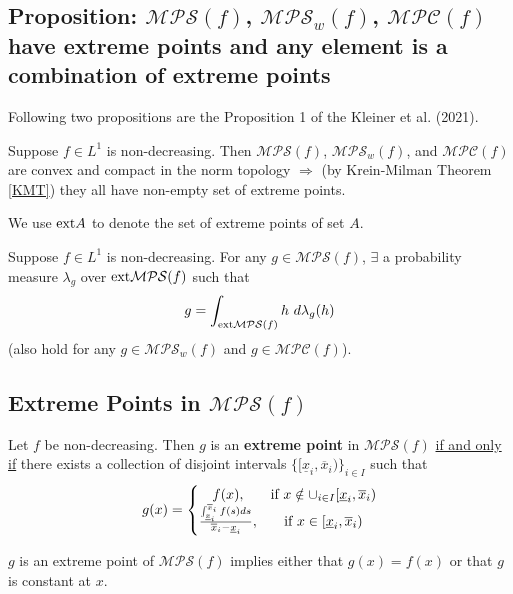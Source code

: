 \documentclass[11pt]{elegantbook}
\begin{document}
\subsection{Proposition: $\mathcal{MPS}(f)$, $\mathcal{MPS}_w(f)$, $\mathcal{MPC}(f)$ have extreme points and any element is a combination of extreme points}

Following two propositions are the Proposition 1 of the Kleiner et al. (2021).
\begin{proposition}
    Suppose $f\in L^1$ is non-decreasing. Then $\mathcal{MPS}(f)$, $\mathcal{MPS}_w(f)$, and $\mathcal{MPC}(f)$ are convex and compact in the norm topology $\Rightarrow$ (by Krein-Milman Theorem \ref{KMT}) they all have non-empty set of extreme points.
\end{proposition}
\begin{note}
    We use $\textnormal{ext} A$ to denote the set of extreme points of set $A$.
\end{note}
\begin{proposition}
    Suppose $f\in L^1$ is non-decreasing. For any $g\in \mathcal{MPS}(f)$, $\exists$ a probability measure $\lambda_g$ over $\textnormal{ext} \mathcal{MPS}(f)$ such that $$g=\int_{\textnormal{ext} \mathcal{MPS}(f)}h\ d\lambda_g(h)$$
    (also hold for any $g\in \mathcal{MPS}_w(f)$ and $g\in \mathcal{MPC}(f)$).
\end{proposition}

\subsection{Extreme Points in $\mathcal{MPS}(f)$}\label{K_thm_1}
\begin{theorem}
    Let $f$ be non-decreasing. Then $g$ is an \textbf{extreme point} in $\mathcal{MPS}(f)$ \underline{if and only if} there exists a collection of disjoint intervals $\{[\underline{x}_i,\overline{x}_i)\}_{i\in I}$ such that
    \begin{equation}
        \begin{aligned}
            g(x)=\left\{\begin{matrix}
                f(x),&\textnormal{if } x\notin \cup_{i\in I}[\underline{x}_i,\overline{x}_i)\\
                \frac{\int_{\underline{x}_i}^{\overline{x}_i}f(s)ds}{\overline{x}_i-\underline{x}_i},&\textnormal{if } x\in [\underline{x}_i,\overline{x}_i)
            \end{matrix}\right.
        \end{aligned}
        \nonumber
    \end{equation}
\end{theorem}
$g$ is an extreme point of $\mathcal{MPS}(f)$ implies either that $g(x)=f(x)$ or that $g$ is constant at $x$.
\end{document}
